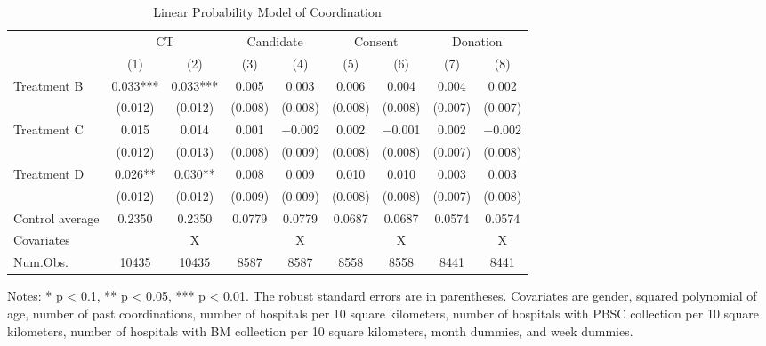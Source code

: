 \documentclass[
  lualatex,
  11pt,
  a4paper
]{article}
\begin{document}
\begin{table}

\caption{\label{tab:est-full-coordination}Linear Probability Model of Coordination}
\centering
\fontsize{9}{11}\selectfont
\begin{threeparttable}
\begin{tabular}[t]{lcccccccc}
\toprule
\multicolumn{1}{c}{ } & \multicolumn{2}{c}{CT} & \multicolumn{2}{c}{Candidate} & \multicolumn{2}{c}{Consent} & \multicolumn{2}{c}{Donation} \\
\cmidrule(l{3pt}r{3pt}){2-3} \cmidrule(l{3pt}r{3pt}){4-5} \cmidrule(l{3pt}r{3pt}){6-7} \cmidrule(l{3pt}r{3pt}){8-9}
  & (1) & (2) & (3) & (4) & (5) & (6) & (7) & (8)\\
\midrule
Treatment B & \num{0.033}*** & \num{0.033}*** & \num{0.005} & \num{0.003} & \num{0.006} & \num{0.004} & \num{0.004} & \num{0.002}\\
 & (\num{0.012}) & (\num{0.012}) & (\num{0.008}) & (\num{0.008}) & (\num{0.008}) & (\num{0.008}) & (\num{0.007}) & (\num{0.007})\\
Treatment C & \num{0.015} & \num{0.014} & \num{0.001} & \num{-0.002} & \num{0.002} & \num{-0.001} & \num{0.002} & \num{-0.002}\\
 & (\num{0.012}) & (\num{0.013}) & (\num{0.008}) & (\num{0.009}) & (\num{0.008}) & (\num{0.008}) & (\num{0.007}) & (\num{0.008})\\
Treatment D & \num{0.026}** & \num{0.030}** & \num{0.008} & \num{0.009} & \num{0.010} & \num{0.010} & \num{0.003} & \num{0.003}\\
 & (\num{0.012}) & (\num{0.012}) & (\num{0.009}) & (\num{0.009}) & (\num{0.008}) & (\num{0.008}) & (\num{0.007}) & (\num{0.008})\\
\midrule
Control average & 0.2350 & 0.2350 & 0.0779 & 0.0779 & 0.0687 & 0.0687 & 0.0574 & 0.0574\\
Covariates &  & X &  & X &  & X &  & X\\
Num.Obs. & \num{10435} & \num{10435} & \num{8587} & \num{8587} & \num{8558} & \num{8558} & \num{8441} & \num{8441}\\
\bottomrule
\end{tabular}
\begin{tablenotes}
\item Notes: * p < 0.1, ** p < 0.05, *** p < 0.01. The robust standard errors are in parentheses. Covariates are gender, squared polynomial of age, number of past coordinations, number of hospitals per 10 square kilometers, number of hospitals with PBSC collection per 10 square kilometers, number of hospitals with BM collection per 10 square kilometers, month dummies, and week dummies.
\end{tablenotes}
\end{threeparttable}
\end{table}
\end{document}
